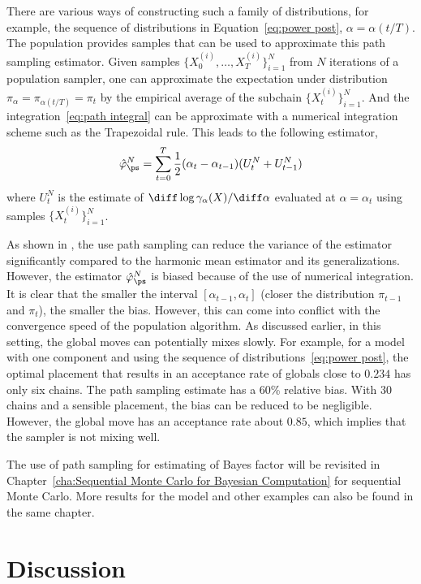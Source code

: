 There are various ways of constructing such a family of distributions, for
example, the sequence of distributions in Equation~\eqref{eq:power post},
$\alpha = \alpha(t/T)$. The population \mcmc provides samples that can be used
to approximate this path sampling estimator. Given samples
$\{X_0^{(i)},\dots,X_T^{(i)}\}_{i=1}^N$ from $N$ iterations of a population
\mcmc sampler, one can approximate the expectation under distribution
$\pi_{\alpha} = \pi_{\alpha(t/T)} = \pi_t$ by the empirical average of the
subchain $\{X_t^{(i)}\}_{i=1}^N$. And the integration~\eqref{eq:path integral}
can be approximate with a numerical integration scheme such as the Trapezoidal
rule. This leads to the following estimator,
\begin{equation}
  \hat\varphi_{\ps}^N = \sum_{t=0}^T
  \frac{1}{2}(\alpha_t - \alpha_{t-1})(U_t^N + U_{t-1}^N)
\end{equation}
where $U_t^N$ is the estimate of
$\diff\log\gamma_{\alpha}(X)/\diff\alpha$ evaluated at $\alpha = \alpha_t$
using samples $\{X_t^{(i)}\}_{i=1}^N$.

As shown in \cite{Calderhead:2009bd}, the use path sampling can reduce the
variance of the estimator significantly compared to the harmonic mean
estimator and its generalizations. However, the estimator
$\hat\varphi_{\ps}^N$ is biased because of the use of numerical integration.
It is clear that the smaller the interval $[\alpha_{t-1},\alpha_t]$ (closer
the distribution $\pi_{t-1}$ and $\pi_t$), the smaller the bias. However, this
can come into conflict with the convergence speed of the population \mcmc
algorithm. As discussed earlier, in this setting, the global moves can
potentially mixes slowly. For example, for a \pet model with one component and
using the sequence of distributions~\eqref{eq:power post}, the optimal
placement that results in an acceptance rate of globals close to $0.234$ has
only six chains. The path sampling estimate has a 60\% relative bias. With 30
chains and a sensible placement, the bias can be reduced to be negligible.
However, the global move has an acceptance rate about $0.85$, which implies
that the sampler is not mixing well.

The use of path sampling for estimating of Bayes factor will be revisited in
Chapter~\ref{cha:Sequential Monte Carlo for Bayesian Computation} for
sequential Monte Carlo. More results for the \pet model and other examples can
also be found in the same chapter.

\section{Discussion}
\label{sec:Monte Carlo Discussion}

